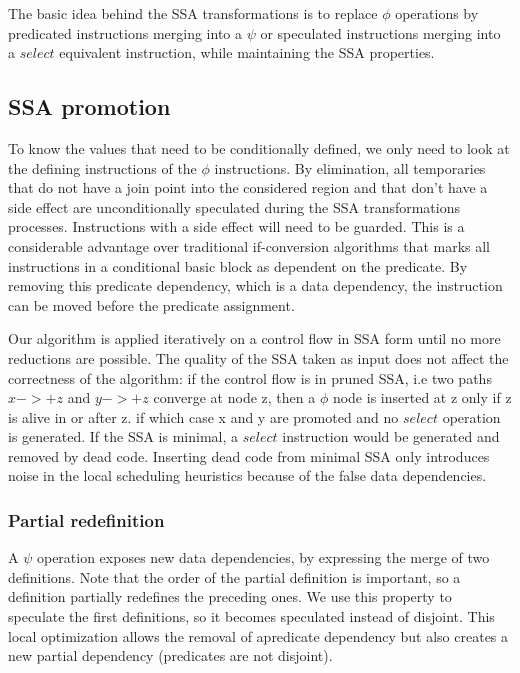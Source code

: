 The basic idea behind the SSA transformations is to replace $\phi$ operations by predicated instructions merging into a $\psi$ or speculated instructions merging into a $select$ equivalent instruction, while maintaining the SSA properties.

\subsection{SSA promotion}

To know the values that need to be conditionally defined, we only need to look at the defining instructions of the $\phi$ instructions. By elimination, all temporaries that do not have a join point into the considered region and that don't have a side effect are unconditionally speculated during the SSA transformations processes. Instructions with a side effect will need to be guarded. This is a considerable advantage over traditional if-conversion algorithms that marks all instructions in a conditional basic block as dependent on the predicate. By removing this predicate dependency, which is a data dependency, the instruction can be moved before the predicate assignment.

Our algorithm is applied iteratively on a control flow in SSA form until no more reductions are possible. The quality of the SSA taken as input does not affect the correctness of the algorithm: if the control flow is in pruned SSA, i.e two paths $x->+z$ and $y->+z$ converge at node z, then a $\phi$ node is inserted at z only if z is alive in or after z. if which case x and y are promoted and no $select$ operation is generated. If the SSA is minimal, a $select$ instruction would be generated and removed by dead code. Inserting dead code from minimal SSA only introduces noise in the local scheduling heuristics because of the false data dependencies.

\subsubsection{Partial redefinition}

A $\psi$ operation exposes new data dependencies, by expressing the merge of two definitions. Note that the order of the partial definition is important, so a definition partially redefines the preceding ones. We use this property to speculate the first definitions, so it becomes speculated instead of disjoint. This local optimization allows the removal of apredicate dependency but also creates a new partial dependency (predicates are not disjoint). 

